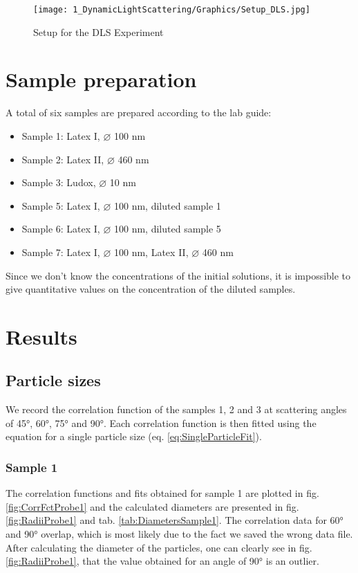 \documentclass{article}
\begin{document}
\begin{figure}[!ht]
    \centering
    \texttt{[image: 1\_DynamicLightScattering/Graphics/Setup\_DLS.jpg]}
    \caption{Setup for the DLS Experiment}
    \label{fig:Setup}
\end{figure}
\FloatBarrier

\section{Sample preparation}

A total of six samples are prepared according to the lab guide:
\begin{itemize}
    \item Sample 1: Latex I, $\diameter$ 100 nm
    \item Sample 2: Latex II, $\diameter$ 460 nm
    \item Sample 3: Ludox, $\diameter$ 10 nm
    \item Sample 5: Latex I, $\diameter$ 100 nm, diluted sample 1
    \item Sample 6: Latex I, $\diameter$ 100 nm, diluted sample 5
    \item Sample 7: Latex I, $\diameter$ 100 nm, Latex II, $\diameter$ 460 nm
\end{itemize}

Since we don't know the concentrations of the initial solutions, it is impossible to give quantitative values on the concentration of the diluted samples.

\newpage
\section{Results}

\subsection{Particle sizes}

We record the correlation function of the samples 1, 2 and 3 at scattering angles of 45°, 60°, 75° and 90°. Each correlation function is then fitted using the equation for a single particle size (eq. \ref{eq:SingleParticleFit}).

\subsubsection{Sample 1}
The correlation functions and fits obtained for sample 1 are plotted in fig. \ref{fig:CorrFctProbe1} and the calculated diameters are presented in fig. \ref{fig:RadiiProbe1} and tab. \ref{tab:DiametersSample1}. 
The correlation data for 60° and 90° overlap, which is most likely due to the fact we saved the wrong data file. After calculating the diameter of the particles, one can clearly see in fig. \ref{fig:RadiiProbe1}, that the value obtained for an angle of 90° is an outlier.
\end{document}
